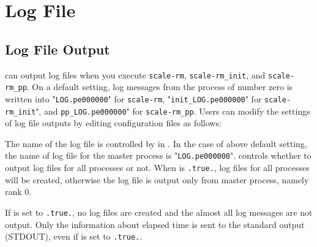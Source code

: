 \section{Log File} \label{sec:log}


\subsection{Log File Output}

\scalerm can output log files when you execute \verb|scale-rm|, \verb|scale-rm_init|, and \verb|scale-rm_pp|.
On a default setting, log messages from the process of number zero is written into "\verb|LOG.pe000000|" for \verb|scale-rm|, "\verb|init_LOG.pe000000|" for \verb|scale-rm_init|", and \verb|pp_LOG.pe000000|" for \verb|scale-rm_pp|.
Users can modify the settings of log file outputs by editing configuration files as follows:


The name of the log file is controlled by  in .
In the case of above default setting, the name of log file for the master process is "\verb|LOG.pe000000|".
 controls whether to output log files for all processes or not.
When  is \verb|.true.|, log files for all processes will be created, otherwise the log file is output only from master process, namely rank 0.

If  is set to \verb|.true.|, no log files are created and the almost all log messages are not output.
Only the information about elapsed time is sent to the standard output (STDOUT), even if  is set to \verb|.true.|.

